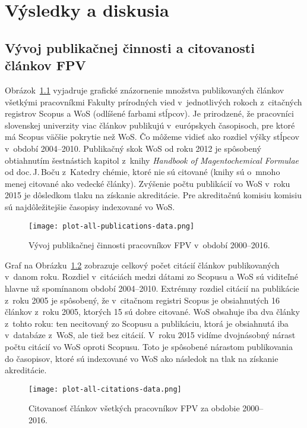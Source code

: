 \chapter{Výsledky a diskusia}
\label{chap:results}

\section{Vývoj publikačnej činnosti a citovanosti článkov FPV}

Obrázok~\ref{fig:all.publications.plot} vyjadruje grafické znázornenie množstva
publikovaných článkov všetkými pracovníkmi Fakulty prírodných vied
v~jednotlivých rokoch z~citačných registrov Scopus a WoS (odlíšené farbami
stĺpcov).  Je prirodzené, že pracovníci slovenskej univerzity viac článkov
publikujú v~európskych časopisoch, pre ktoré má Scopus väčšie pokrytie než WoS.
Čo môžeme vidieť ako rozdiel výšky stĺpcov v~období 2004--2010.  Publikačný skok
WoS od roku 2012 je spôsobený obtiahnutím šestnástich kapitol z~knihy
\emph{Handbook of Magentochemical Formulae} od doc.\,J.\,Boču z~Katedry chémie,
ktoré nie sú citované (knihy sú o~mnoho menej citované ako vedecké články).
Zvýšenie počtu publikácií vo WoS v~roku 2015 je dôsledkom tlaku na získanie
akreditácie.  Pre akreditačnú komisiu komisiu sú najdôležitejšie časopisy
indexované vo WoS.

\begin{figure}
  \centering
  \texttt{[image: plot-all-publications-data.png]}
  \caption[Vývoj publikačnej činnosti pracovníkov FPV v~období 2000--2016]%
  {Vývoj publikačnej činnosti pracovníkov FPV v~období 2000--2016.}
  \label{fig:all.publications.plot}
\end{figure}

Graf na Obrázku~\ref{fig:all.citations.plot} zobrazuje celkový počet citácií
článkov publikovaných v~danom roku.  Rozdiel v~citáciách medzi dátami zo Scopusu
a WoS sú viditeľné hlavne už spomínanom období 2004--2010.  Extrémny rozdiel
citácií na publikácie z~roku 2005 je spôsobený, že v~citačnom registri Scopus je
obsiahnutých 16 článkov z~roku 2005, ktorých 15 sú dobre citované.  WoS obsahuje
iba dva články z~tohto roku: ten necitovaný zo Scopusu a publikáciu, ktorá je
obsiahnutá iba v~databáze z~WoS, ale tiež bez citácií.  V~roku 2015 vidíme
dvojnásobný nárast počtu citácií vo WoS oproti Scopusu.  Toto je spôsobené
nárastom publikovania do časopisov, ktoré sú indexované vo WoS ako následok na
tlak na získanie akreditácie.

\begin{figure}
  \centering
  \texttt{[image: plot-all-citations-data.png]}
  \caption[Citovanosť článkov všetkých pracovníkov FPV za obdobie 2000--2016]%
  {Citovanosť článkov všetkých pracovníkov FPV za obdobie 2000--2016.}
  \label{fig:all.citations.plot}
\end{figure}


